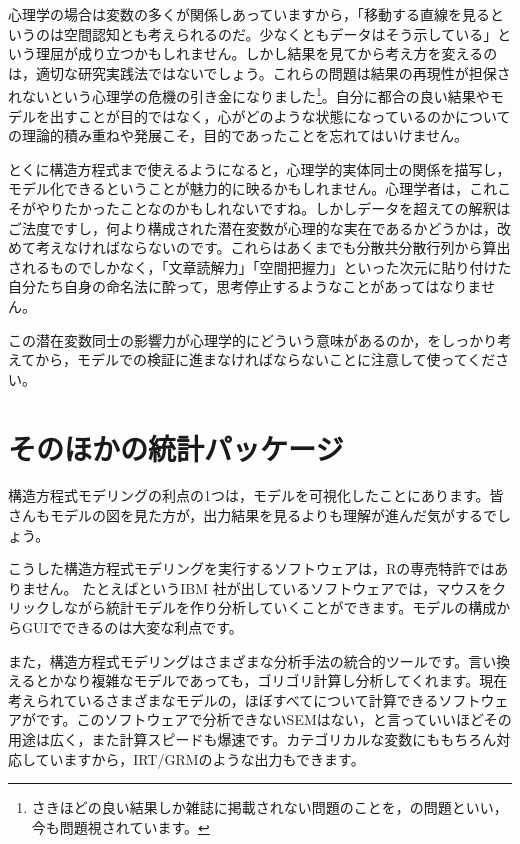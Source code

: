\documentclass{ltjsbook}
\begin{document}
心理学の場合は変数の多くが関係しあっていますから，「移動する直線を見るというのは空間認知とも考えられるのだ。少なくともデータはそう示している」という理屈が成り立つかもしれません。しかし結果を見てから考え方を変えるのは，適切な研究実践法ではないでしょう。これらの問題は結果の再現性が担保されないという心理学の危機の引き金になりました\footnote{さきほどの良い結果しか雑誌に掲載されない問題のことを，の問題といい，今も問題視されています。}。自分に都合の良い結果やモデルを出すことが目的ではなく，心がどのような状態になっているのかについての理論的積み重ねや発展こそ，目的であったことを忘れてはいけません。

とくに構造方程式まで使えるようになると，心理学的実体同士の関係を描写し，モデル化できるということが魅力的に映るかもしれません。心理学者は，これこそがやりたかったことなのかもしれないですね。しかしデータを超えての解釈はご法度ですし，何より構成された潜在変数が心理的な実在であるかどうかは，改めて考えなければならないのです。これらはあくまでも分散共分散行列から算出されるものでしかなく，「文章読解力」「空間把握力」といった次元に貼り付けた自分たち自身の命名法に酔って，思考停止するようなことがあってはなりません。

この潜在変数同士の影響力が心理学的にどういう意味があるのか，をしっかり考えてから，モデルでの検証に進まなければならないことに注意して使ってください。

\section{そのほかの統計パッケージ}

構造方程式モデリングの利点の1つは，モデルを可視化したことにあります。皆さんもモデルの図を見た方が，出力結果を見るよりも理解が進んだ気がするでしょう。

こうした構造方程式モデリングを実行するソフトウェアは，Rの専売特許ではありません。
たとえばというIBM 社が出しているソフトウェアでは，マウスをクリックしながら統計モデルを作り分析していくことができます。モデルの構成からGUIでできるのは大変な利点です。

また，構造方程式モデリングはさまざまな分析手法の統合的ツールです。言い換えるとかなり複雑なモデルであっても，ゴリゴリ計算し分析してくれます。現在考えられているさまざまなモデルの，ほぼすべてについて計算できるソフトウェアがです。このソフトウェアで分析できないSEMはない，と言っていいほどその用途は広く，また計算スピードも爆速です。カテゴリカルな変数にももちろん対応していますから，IRT/GRMのような出力もできます。
\end{document}
